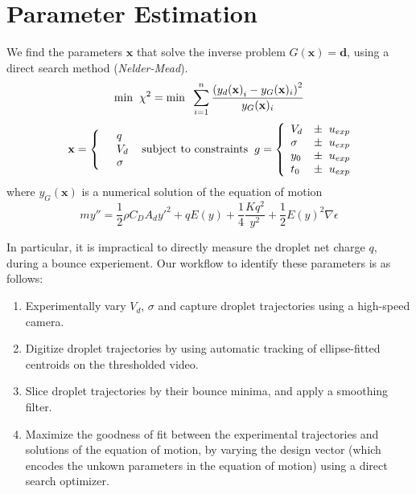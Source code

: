 \documentclass[10pt,a4paper]{article}
\author{Erin Schmidt}
\begin{document}
\doublespacing
\section{Parameter Estimation}
We find the parameters $\mathbf{x}$ that solve the inverse problem $G(\mathbf{x}) = \mathbf{d}$, using a direct search method (\emph{Nelder-Mead}). 
\[
\mbox{min} \hspace{2 mm} \chi^2 = \mbox{min} \hspace{2 mm} \sum^n_{i=1} \frac{\left({y_d(\mathbf{x})}_i - y_G(\mathbf{x})_i \right)^2}{y_G(\mathbf{x})_i}
\]
\begin{eqnarray*} \mbox{} \hspace{2 mm} \begin{split} \mathbf{x} = \left\{ \begin{array}{ll}      & q\\
		  &	V_d\\
          & \sigma 
          \end{array} \right. 
          \end{split} \hspace{2 mm} \mbox{subject to constraints} \hspace{2 mm} \begin{split}
          g = \left\{ \begin{array}{ll}
           V_d &\pm \hspace{2 mm} u_{exp}\\
      	   \sigma &\pm  \hspace{2 mm} u_{exp}\\
      	   y_0 &\pm \hspace{2 mm} u_{exp}\\
      	   t_0 &\pm \hspace{2 mm} u_{exp}\\
          \end{array} \right. 
          \end{split}
\end{eqnarray*}
where $y_G(\mathbf{x})$ is a numerical solution of the equation of motion
\[
m y'' = \frac{1}{2} \rho C_D A_d {y'}^2 + q E(y) + \frac{1}{4} \frac{K q^2}{y^2} + \frac{1}{2} {E(y)}^2 \nabla \epsilon\]

In particular, it is impractical to directly measure the droplet net charge $q$, during a bounce experiement. Our workflow to identify these parameters is as follows:
\begin{enumerate}
\item Experimentally vary $V_d$, $\sigma$ and capture droplet trajectories using a high-speed camera.
\item Digitize droplet trajectories by using automatic tracking of ellipse-fitted centroids on the thresholded video.
\item Slice droplet trajectories by their bounce minima, and apply a smoothing filter.
\item Maximize the goodness of fit between the experimental trajectories and solutions of the equation of motion, by varying the design vector (which encodes the unkown parameters in the equation of motion) using a direct search optimizer. 
\end{enumerate}
\end{document}
